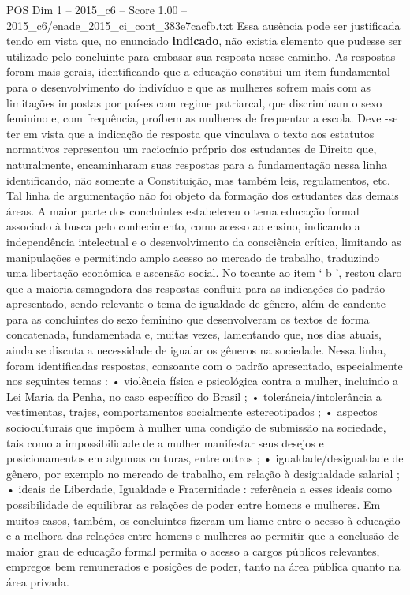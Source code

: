 \begin{textsample}{POS Dim 1 – 2015\_c6 – Score 1.00 – 2015\_c6/enade\_2015\_ci\_cont\_383e7cacfb.txt}
Essa ausência pode ser justificada tendo em vista que, no enunciado \textbf{indicado}, não existia elemento que pudesse ser utilizado pelo concluinte para embasar sua resposta nesse caminho.
As respostas foram mais gerais, identificando que a educação constitui um item fundamental para o desenvolvimento do indivíduo e que as mulheres sofrem mais com as limitações impostas por países com regime patriarcal, que discriminam o sexo feminino e, com frequência, proíbem as mulheres de frequentar a escola.
Deve -se ter em vista que a indicação de resposta que vinculava o texto aos estatutos normativos representou um raciocínio próprio dos estudantes de Direito que, naturalmente, encaminharam suas respostas para a fundamentação nessa linha identificando, não somente a Constituição, mas também leis, regulamentos, etc.
Tal linha de argumentação não foi objeto da formação dos estudantes das demais áreas.
A maior parte dos concluintes estabeleceu o tema educação formal associado à busca pelo conhecimento, como acesso ao ensino, indicando a independência intelectual e o desenvolvimento da consciência crítica, limitando as manipulações e permitindo amplo acesso ao mercado de trabalho, traduzindo uma libertação econômica e ascensão social.
No tocante ao item ‘ b ’, restou claro que a maioria esmagadora das respostas confluiu para as indicações do padrão apresentado, sendo relevante o tema de igualdade de gênero, além de candente para as concluintes do sexo feminino que desenvolveram os textos de forma concatenada, fundamentada e, muitas vezes, lamentando que, nos dias atuais, ainda se discuta a necessidade de igualar os gêneros na sociedade.
Nessa linha, foram identificadas respostas, consoante com o padrão apresentado, especialmente nos seguintes temas : • violência física e psicológica contra a mulher, incluindo a Lei Maria da Penha, no caso específico do Brasil ; • tolerância/intolerância a vestimentas, trajes, comportamentos socialmente estereotipados ; • aspectos socioculturais que impõem à mulher uma condição de submissão na sociedade, tais como a impossibilidade de a mulher manifestar seus desejos e posicionamentos em algumas culturas, entre outros ; • igualdade/desigualdade de gênero, por exemplo no mercado de trabalho, em relação à desigualdade salarial ; • ideais de Liberdade, Igualdade e Fraternidade : referência a esses ideais como possibilidade de equilibrar as relações de poder entre homens e mulheres.
Em muitos casos, também, os concluintes fizeram um liame entre o acesso à educação e a melhora das relações entre homens e mulheres ao permitir que a conclusão de maior grau de educação formal permita o acesso a cargos públicos relevantes, empregos bem remunerados e posições de poder, tanto na área pública quanto na área privada.

\end{textsample}
